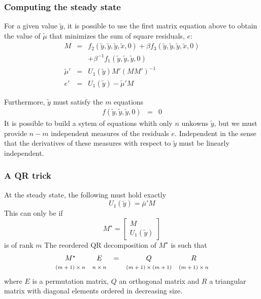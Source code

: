 \documentclass{beamer}
\begin{document}
\begin{frame}
  \frametitle{Computing the steady state}
For a given value  $\tilde y$, it is possible to use the first matrix equation above to obtain the value of $\tilde \mu$ that minimizes the sum of square residuals, $e$:
\begin{eqnarray*}
M &=& f_{2}(\tilde y, \tilde y, \tilde y,
\tilde x, 0) +\beta f_{3}(\tilde y,
\tilde y, \tilde y, \tilde x, 0)\\
&& +\beta^{-1}f_{1}(\tilde y, \tilde y, \tilde y,
0)\\ 
\tilde\mu' &=& U_1(\tilde y)M'\left(MM'\right)^{-1}\\
e' &=& U_1(\tilde y) - \tilde\mu'M
\end{eqnarray*}

Furthermore, $\tilde y$ must satisfy the $m$ equations
\begin{eqnarray*}
f(\tilde y, \tilde y, \tilde y, 0)&=&0
\end{eqnarray*}
It is possible to build a sytem of equations whith only $n$ unkowns $\tilde y$, but we must provide $n-m$ independent measures of the residuals $e$. Independent in the sense that the derivatives of these measures with respect to $\tilde y$ must be linearly independent.
\end{frame}

\begin{frame}
  \frametitle{A QR trick}
At the steady state, the following must hold  exactly
\[
U_1\left(\tilde y\right) = \bar\mu'M
\]
This can only be if
\[
M^\star = \left[\begin{array}{c}M\\U_1\left(\tilde y\right)\end{array}\right]
\]
is of rank $m$
The reordered QR decomposition of $M^\star$ is such that
\[
\begin{array}{ccccc}
  M^\star & E & = & Q & R\\
\mbox{\scriptsize $(m+1)\times n$} & \mbox{\scriptsize $n\times n$} && \mbox{\scriptsize $(m+1)\times (m+1)$} & \mbox{\scriptsize $(m+1)\times n$}
\end{array}
\]
where $E$ is a permutation matrix, $Q$ an orthogonal matrix and $R$ a triangular matrix with diagonal elements ordered in decreasing size.
\end{frame}
\end{document}

